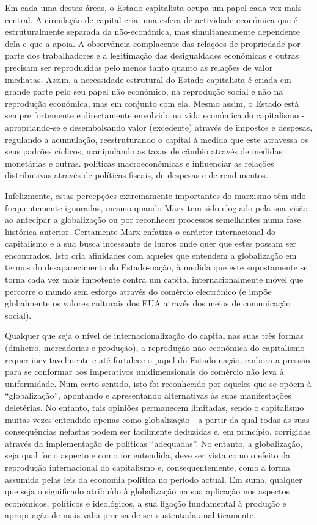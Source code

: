  \par 
Em cada uma destas áreas, o Estado capitalista ocupa um papel cada vez mais central. A circulação de capital cria uma esfera de actividade económica que é estruturalmente separada da não-económica, mas simultaneamente dependente dela e que a apoia. A observância complacente das relações de propriedade por parte dos trabalhadores e a legitimação das desigualdades económicas e outras precisam ser reproduzidas pelo menos tanto quanto as relações de valor imediatas. Assim, a necessidade estrutural do Estado capitalista é criada em grande parte pelo seu papel não económico, na reprodução social e não na reprodução económica, mas em conjunto com ela. Mesmo assim, o Estado está sempre fortemente e directamente envolvido na vida económica do capitalismo - apropriando-se e desembolsando valor (excedente) através de impostos e despesas, regulando a acumulação, reestruturando o capital à medida que este atravessa os seus padrões cíclicos, manipulando as taxas de câmbio através de medidas monetárias e outras. políticas macroeconómicas e influenciar as relações distributivas através de políticas fiscais, de despesas e de rendimentos.
 \par 
Infelizmente, estas percepções extremamente importantes do marxismo têm sido frequentemente ignoradas, mesmo quando Marx tem sido elogiado pela sua visão ao antecipar a globalização ou por reconhecer processos semelhantes numa fase histórica anterior. Certamente Marx enfatiza o carácter internacional do capitalismo e a sua busca incessante de lucros onde quer que estes possam ser encontrados. Isto cria afinidades com aqueles que entendem a globalização em termos do desaparecimento do Estado-nação, à medida que este supostamente se torna cada vez mais impotente contra um capital internacionalmente móvel que percorre o mundo sem esforço através do comércio electrónico (e impõe globalmente os valores culturais dos EUA através dos meios de comunicação social).
 \par 
Qualquer que seja o nível de internacionalização do capital nas suas três formas (dinheiro, mercadorias e produção), a reprodução não económica do capitalismo requer inevitavelmente e até fortalece o papel do Estado-nação, embora a pressão para se conformar aos imperativos unidimensionais do comércio não leva à uniformidade. Num certo sentido, isto foi reconhecido por aqueles que se opõem à “globalização”, apontando e apresentando alternativas às suas manifestações deletérias. No entanto, tais opiniões permanecem limitadas, sendo o capitalismo muitas vezes entendido apenas como globalização - a partir da qual todas as suas consequências nefastas podem ser facilmente deduzidas e, em princípio, corrigidas através da implementação de políticas “adequadas”. No entanto, a globalização, seja qual for o aspecto e como for entendida, deve ser vista como o efeito da reprodução internacional do capitalismo e, consequentemente, como a forma assumida pelas leis da economia política no período actual. Em suma, qualquer que seja o significado atribuído à globalização na sua aplicação nos aspectos económicos, políticos e ideológicos, a sua ligação fundamental à produção e apropriação de mais-valia precisa de ser sustentada analiticamente.
 \par 
